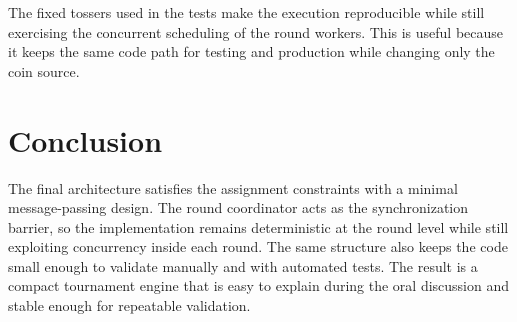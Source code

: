 \documentclass[11pt,a4paper]{article}
\begin{document}
The fixed tossers used in the tests make the execution reproducible while still exercising the concurrent scheduling of the round workers.
This is useful because it keeps the same code path for testing and production while changing only the coin source.

\section*{Conclusion}
The final architecture satisfies the assignment constraints with a minimal message-passing design.
The round coordinator acts as the synchronization barrier, so the implementation remains deterministic at the round level while still exploiting concurrency inside each round.
The same structure also keeps the code small enough to validate manually and with automated tests.
The result is a compact tournament engine that is easy to explain during the oral discussion and stable enough for repeatable validation.
\end{document}
